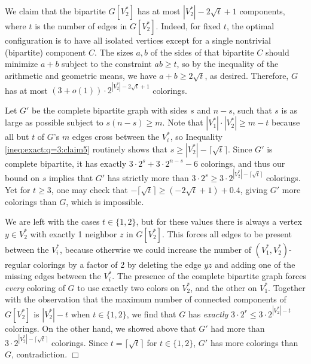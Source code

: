 \documentclass[11pt]{article}
\begin{document}
We claim that the bipartite $G[V_2^*]$ has at most $|V_2^*| -
2\sqrt{t} + 1$ components, where $t$ is the number of edges in
$G[V_2^*]$.  Indeed, for fixed $t$, the optimal configuration is to
have all isolated vertices except for a single nontrivial (bipartite)
component $C$.  The sizes $a,b$ of the sides of that bipartite $C$
should minimize $a+b$ subject to the constraint $ab \geq t$, so by the
inequality of the arithmetic and geometric means, we have $a+b \geq
2\sqrt{t}$, as desired.  Therefore, $G$ has at most $(3+o(1)) \cdot
2^{|V_2^*| - 2\sqrt{t} + 1}$ colorings.

Let $G'$ be the complete bipartite graph with sides $s$ and $n-s$,
such that $s$ is as large as possible subject to $s(n-s) \geq m$.
Note that $|V_1^*| \cdot |V_2^*| \geq m-t$ because all but $t$ of
$G$'s $m$ edges cross between the $V_i^*$, so Inequality
\ref{ineq:exact:q=3:claim5} routinely shows that $s \geq |V_2^*| -
\lceil \sqrt{t} \rceil$.  Since $G'$ is complete bipartite, it has
exactly $3 \cdot 2^s + 3 \cdot 2^{n-s} - 6$ colorings, and thus our
bound on $s$ implies that $G'$ has strictly more than $3 \cdot 2^s
\geq 3 \cdot 2^{|V_2^*| - \lceil \sqrt{t} \rceil}$ colorings.  Yet for
$t \geq 3$, one may check that $-\lceil \sqrt{t} \rceil \geq
(-2\sqrt{t} + 1) + 0.4$, giving $G'$ more colorings than $G$, which is
impossible.

We are left with the cases $t \in \{1,2\}$, but for these values there
is always a vertex $y \in V_2^*$ with exactly 1 neighbor $z$ in
$G[V_2^*]$.  This forces all edges to be present between the $V_i^*$,
because otherwise we could increase the number of $(V_1^*,
V_2^*)$-regular colorings by a factor of 2 by deleting the edge $yz$
and adding one of the missing edges between the $V_i^*$.  The presence
of the complete bipartite graph forces \emph{every}\/ coloring of $G$
to use exactly two colors on $V_2^*$, and the other on $V_1^*$.
Together with the observation that the maximum number of connected
components of $G[V_2^*]$ is $|V_2^*| - t$ when $t \in \{1,2\}$, we
find that $G$ has \emph{exactly}\/ $3 \cdot 2^r \leq 3 \cdot
2^{|V_2^*| - t}$ colorings.  On the other hand, we showed above that
$G'$ had more than $3 \cdot 2^{|V_2^*| - \lceil \sqrt{t} \rceil}$
colorings.  Since $t = \lceil \sqrt{t} \rceil$ for $t \in \{1,2\}$,
$G'$ has more colorings than $G$, contradiction.  \hfill $\Box$



\vspace{3mm}
\end{document}
